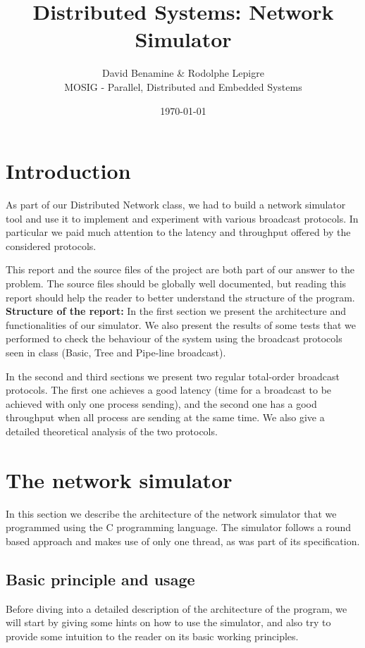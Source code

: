 \documentclass[a4paper]{article}
\begin{document}
\title{Distributed Systems: Network Simulator}
\author{David Benamine \& Rodolphe Lepigre\\
        MOSIG - Parallel, Distributed and Embedded Systems}
\date{\today}
\maketitle

\section*{Introduction}
As part of our Distributed Network class, we had to build a network simulator
tool and use it to implement and experiment with various broadcast protocols.
In particular we paid much attention to the latency and throughput offered by
the considered protocols.

This report and the source files of the project are both part of our answer to
the problem. The source files should be globally well documented, but reading
this report should help the reader to better understand the structure of the
program.\\

\noindent\textbf{Structure of the report:} In the first section we present the
architecture and functionalities of our simulator. We also present the results
of some tests that we performed to check the behaviour of the system using the
broadcast protocols seen in class (Basic, Tree and Pipe-line broadcast).

In the second and third sections we present two regular total-order broadcast
protocols. The first one achieves a good latency (time for a broadcast to be
achieved with only one process sending), and the second one has a good
throughput when all process are sending at the same time. We also give a
detailed theoretical analysis of the two protocols.

\section{The network simulator}
In this section we describe the architecture of the network simulator that we
programmed using the C programming language. The simulator follows a round
based approach and makes use of only one thread, as was part of its
specification.

\subsection{Basic principle and usage}
Before diving into a detailed description of the architecture of the program,
we will start by giving some hints on how to use the simulator, and also try
to provide some intuition to the reader on its basic working principles.
\end{document}
